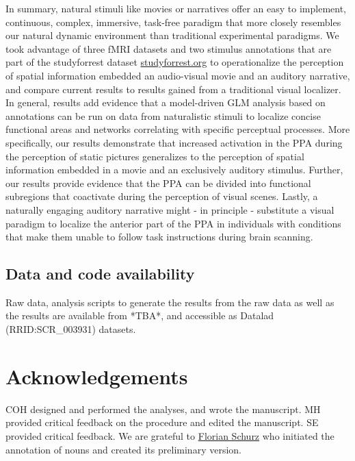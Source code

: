 \documentclass[english]{article}
\begin{document}
In summary, natural stimuli like movies \citep{eickhoff2020towards,
hasson2008neurocinematics, sonkusare2019naturalistic} or narratives
\citep{hamilton2018revolution, honey2012not, lerner2011topographic,
silbert2014coupled, wilson2008beyond} offer an easy to implement, continuous,
complex, immersive, task-free paradigm that more closely resembles our natural
dynamic environment than traditional experimental paradigms.
We took advantage of three fMRI datasets and two stimulus annotations that are
part of the studyforrest dataset
\href{http://www.studyforrest.org}{studyforrest.org} to operationalize the
perception of spatial information embedded an audio-visual movie and an auditory
narrative, and compare current results to results gained from a traditional
visual localizer.
In general, results add evidence that a model-driven GLM analysis based on
annotations can be run on data from naturalistic stimuli to localize concise
functional areas and networks correlating with specific perceptual processes.
More specifically, our results demonstrate that increased activation in the PPA
during the perception of static pictures generalizes to the perception of
spatial information embedded in a movie and an exclusively auditory stimulus.
Further, our results provide evidence that the PPA can be divided into
functional subregions that coactivate during the perception of visual
scenes.
Lastly, a naturally engaging auditory narrative might - in principle -
substitute a visual paradigm to localize the anterior part of the PPA in
individuals with conditions that make them unable to follow task instructions
during brain scanning.


\subsection*{Data and code availability}

Raw data, analysis scripts to generate the results from the raw data as well as
the results are available from *TBA*, and accessible as Datalad
(RRID:SCR_003931) datasets.


\section*{Acknowledgements}

%
COH designed and performed the analyses, and wrote the manuscript.
%
MH provided critical feedback on the procedure and edited the manuscript.
%
SE provided critical feedback.
%
We are grateful to \href{www.florianschurz.de}{Florian Schurz} who initiated the
annotation of nouns and created its preliminary version.%
\end{document}
